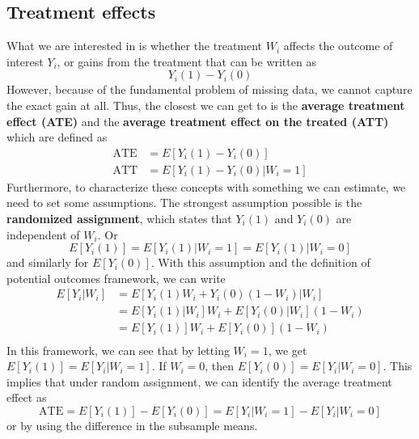 \documentclass[12pt]{article}
\theoremstyle{definition}
\theoremstyle{property}
\theoremstyle{assumption}
\theoremstyle{example}
\theoremstyle{comment}
\begin{document}
\subsection{Treatment effects}
What we are interested in is whether the treatment $W_i$ affects the outcome of interest $Y_i$, or gains from the treatment that can be written as
\[
Y_i(1)-Y_i(0)
\]
However, because of the fundamental problem of missing data, we cannot capture the exact gain at all. Thus, the closest we can get to is the \textbf{average treatment effect (ATE)} and the \textbf{average treatment effect on the treated (ATT)} which are defined as
\[
\begin{aligned}
\text{ATE}&=E[Y_i(1)-Y_i(0)]\\
\text{ATT}&=E[Y_i(1)-Y_i(0)|W_i=1]
\end{aligned}
\]
Furthermore, to characterize these concepts with something we can estimate, we need to set some assumptions. The strongest assumption possible is the \textbf{randomized assignment}, which states that $Y_i(1)$ and $Y_i(0)$ are independent of $W_i$. Or
\[
E[Y_i(1)]= E[Y_i(1)|W_i=1]=E[Y_i(1)|W_i=0]
\]
and similarly for $E[Y_i(0)]$. With this assumption and the definition of potential outcomes framework, we can write
\[
\begin{aligned}
E[Y_i|W_i]&=E[Y_i(1)W_i + Y_i(0)(1-W_i)|W_i]\\
&=E[Y_i(1)|W_i]W_i+E[Y_i(0)|W_i](1-W_i)\\
&=E[Y_i(1)]W_i+E[Y_i(0)](1-W_i)\\
\end{aligned}
\]
In this framework, we can see that by letting $W_i=1$, we get $E[Y_i(1)]=E[Y_i|W_i=1]$. If $W_i=0$, then $E[Y_i(0)]=E[Y_i|W_i=0]$. This implies that under random assignment, we can identify the average treatment effect as
\[
\text{ATE}=E[Y_i(1)]-E[Y_i(0)] = E[Y_i|W_i=1]-E[Y_i|W_i=0]
\]
or by using the difference in the subsample means.\par
\end{document}
